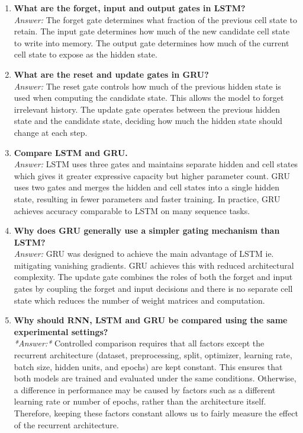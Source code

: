 \documentclass[10pt]{article}
\begin{document}
\begin{enumerate}
\item \textbf{What are the forget, input and output gates in LSTM?}\\
\textit{Answer:} The forget gate determines what fraction of the previous cell state to retain. The input gate determines how much of the new candidate cell state to write into memory. The output gate determines how much of the current cell state to expose as the hidden state.\\
\vspace{8mm}

\item \textbf{What are the reset and update gates in GRU?}\\
\textit{Answer:} The reset gate controls how much of the previous hidden state is used when computing the candidate state. This allows the model to forget irrelevant history. The update gate operates between the previous hidden state and the candidate state, deciding how much the hidden state should change at each step.\\
\vspace{8mm}

\item \textbf{Compare LSTM and GRU.}\\
\textit{Answer:} LSTM uses three gates and maintains separate hidden and cell states which gives it greater expressive capacity but higher parameter count. GRU uses two gates and merges the hidden and cell states into a single hidden state, resulting in fewer parameters and faster training. In practice, GRU achieves accuracy comparable to LSTM on many sequence tasks.\\
\vspace{8mm}

\item \textbf{Why does GRU generally use a simpler gating mechanism than LSTM?}\\
\textit{Answer:} GRU was designed to achieve the main advantage of LSTM ie. mitigating vanishing gradients. GRU achieves this with reduced architectural complexity. The update gate combines the roles of both the forget and input gates by coupling the forget and input decisions and there is no separate cell state which reduces the number of weight matrices and computation.\\
\vspace{8mm}

\item \textbf{Why should RNN, LSTM and GRU be compared using the same experimental settings?}\\
\textit{*Answer:*} Controlled comparison requires that all factors except the recurrent architecture (dataset, preprocessing, split, optimizer, learning rate, batch size, hidden units, and epochs) are kept constant. This ensures that both models are trained and evaluated under the same conditions. Otherwise, a difference in performance may be caused by factors such as a different learning rate or number of epochs, rather than the architecture itself. Therefore, keeping these factors constant allows us to fairly measure the effect of the recurrent architecture.\\
\vspace{8mm}


\end{enumerate}
\end{document}
